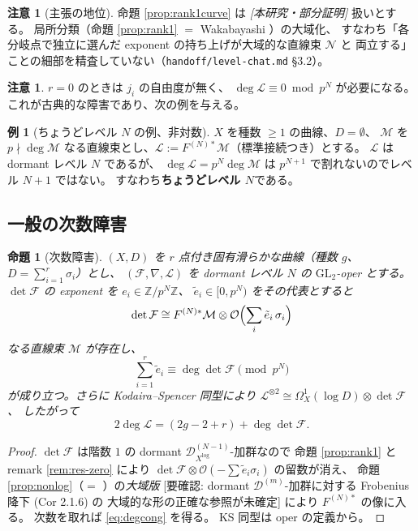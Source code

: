 \documentclass[a4paper,11pt]{ltjsarticle}
\theoremstyle{plain}
\newtheorem{proposition}[theorem]{命題}
\theoremstyle{definition}
\newtheorem{example}[theorem]{例}
\newtheorem{remark}[theorem]{注意}
\newcommand{\NeedsCheck}[1]{\textcolor{blue!70!black}{\textsf{[要確認: #1]}}}
\newcommand{\bbZ}{\mathbb{Z}}
\newcommand{\cD}{\mathcal{D}}
\newcommand{\cF}{\mathcal{F}}
\newcommand{\cL}{\mathcal{L}}
\newcommand{\cM}{\mathcal{M}}
\newcommand{\cN}{\mathcal{N}}
\newcommand{\cO}{\mathcal{O}}
\newcommand{\Dlog}[1]{\cD^{(#1)}_{X^{\log}}}
\begin{document}
\begin{remark}[主張の地位]\label{rem:rank1curve-status}
命題 \ref{prop:rank1curve} は \emph{[本研究・部分証明]} 扱いとする。
局所分類（命題 \ref{prop:rank1} $=$ Wakabayashi \cite[Prop.~3.2.1]{Wak}）の大域化、
すなわち「各分岐点で独立に選んだ exponent の持ち上げが大域的な直線束 $\cN$ と
両立する」ことの細部を精査していない（\texttt{handoff/level-chat.md} \S3.2）。
\end{remark}

\begin{remark}
$r=0$ のときは $j_i$ の自由度が無く、
$\deg\cL\equiv0\bmod p^N$ が必要になる。
これが古典的な障害であり、次の例を与える。
\end{remark}

\begin{example}[ちょうどレベル $N$ の例、非対数]\label{ex:exactN}
$X$ を種数 $\ge1$ の曲線、$D=\emptyset$、
$\cM$ を $p\nmid\deg\cM$ なる直線束とし、$\cL:=F^{(N)*}\cM$（標準接続つき）とする。
$\cL$ は dormant レベル $N$ であるが、
$\deg\cL=p^N\deg\cM$ は $p^{N+1}$ で割れないのでレベル $N+1$ ではない。
すなわち\textbf{ちょうどレベル $N$}である。
\end{example}

\subsection{一般の次数障害}

\begin{proposition}[次数障害]\label{prop:degree}
$(X,D)$ を $r$ 点付き固有滑らかな曲線（種数 $g$、$D=\sum_{i=1}^r\sigma_i$）とし、
$(\cF,\nabla,\cL)$ を dormant レベル $N$ の $\mathrm{GL}_2$-oper とする。
$\det\cF$ の exponent を $e_i\in\bbZ/p^N\bbZ$、
$\tilde e_i\in[0,p^N)$ をその代表とすると
\[
  \det\cF\cong F^{(N)*}\cM\otimes\cO\Bigl(\sum_i\tilde e_i\,\sigma_i\Bigr)
\]
なる直線束 $\cM$ が存在し、
\begin{equation}\label{eq:degcong}
  \boxed{\ \sum_{i=1}^r\tilde e_i\equiv\deg\det\cF \pmod{p^N}\ }
\end{equation}
が成り立つ。さらに Kodaira--Spencer 同型により
$\cL^{\otimes2}\cong\Omega^1_X(\log D)\otimes\det\cF$、
したがって
\[
  2\deg\cL=(2g-2+r)+\deg\det\cF .
\]
\end{proposition}

\begin{proof}
$\det\cF$ は階数 $1$ の dormant $\Dlog{N-1}$-加群なので
命題 \ref{prop:rank1} と remark \ref{rem:res-zero} により
$\det\cF\otimes\cO(-\sum\tilde e_i\sigma_i)$ の留数が消え、
命題 \ref{prop:nonlog}（$=$ \cite[Cor.~2.1.6]{Wak}）の\emph{大域版}%
\NeedsCheck{dormant $\cD^{(m)}$-加群に対する Frobenius 降下 (Cor 2.1.6) の
大域的な形の正確な参照が未確定}%
により $F^{(N)*}$ の像に入る。
次数を取れば \eqref{eq:degcong} を得る。
KS 同型は oper の定義から。
\end{proof}
\end{document}
